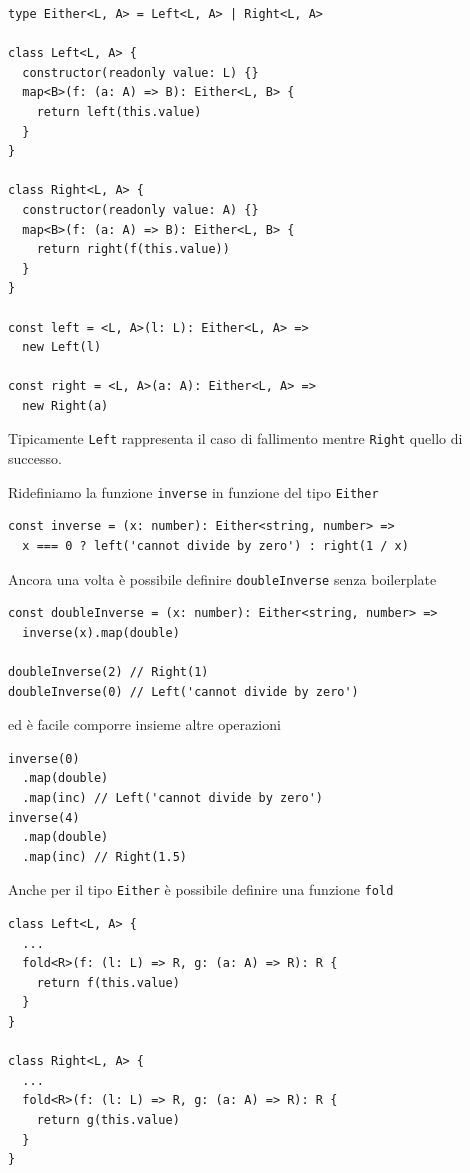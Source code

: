 \documentclass[12pt]{article}
\begin{document}
\begin{verbatim}
type Either<L, A> = Left<L, A> | Right<L, A>

class Left<L, A> {
  constructor(readonly value: L) {}
  map<B>(f: (a: A) => B): Either<L, B> {
    return left(this.value)
  }
}

class Right<L, A> {
  constructor(readonly value: A) {}
  map<B>(f: (a: A) => B): Either<L, B> {
    return right(f(this.value))
  }
}

const left = <L, A>(l: L): Either<L, A> =>
  new Left(l)

const right = <L, A>(a: A): Either<L, A> =>
  new Right(a)
\end{verbatim}

Tipicamente \texttt{Left} rappresenta il caso di fallimento mentre \texttt{Right} quello di successo.

Ridefiniamo la funzione \texttt{inverse} in funzione del tipo \texttt{Either}

\begin{verbatim}
const inverse = (x: number): Either<string, number> =>
  x === 0 ? left('cannot divide by zero') : right(1 / x)
\end{verbatim}

Ancora una volta è possibile definire \texttt{doubleInverse} senza boilerplate

\begin{verbatim}
const doubleInverse = (x: number): Either<string, number> =>
  inverse(x).map(double)

doubleInverse(2) // Right(1)
doubleInverse(0) // Left('cannot divide by zero')
\end{verbatim}

ed è facile comporre insieme altre operazioni

\begin{verbatim}
inverse(0)
  .map(double)
  .map(inc) // Left('cannot divide by zero')
inverse(4)
  .map(double)
  .map(inc) // Right(1.5)
\end{verbatim}

Anche per il tipo \texttt{Either} è possibile definire una funzione \texttt{fold}

\begin{verbatim}
class Left<L, A> {
  ...
  fold<R>(f: (l: L) => R, g: (a: A) => R): R {
    return f(this.value)
  }
}

class Right<L, A> {
  ...
  fold<R>(f: (l: L) => R, g: (a: A) => R): R {
    return g(this.value)
  }
}
\end{verbatim}
\end{document}
